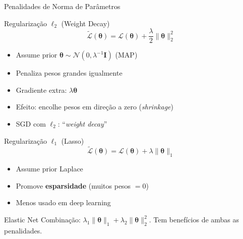 \documentclass[7pt, aspectratio=169,10pt]{beamer}
\newcommand{\btheta}{\bm{\theta}}
\begin{document}
\begin{frame}{Penalidades de Norma de Parâmetros}
\begin{block}{Regularização $\ell_2$ (Weight Decay)}
\[
\tilde{\mathcal{L}}(\btheta) = \mathcal{L}(\btheta) + \frac{\lambda}{2}\|\btheta\|_2^2
\]
\small
\begin{itemize}
  \item Assume prior $\btheta \sim \mathcal{N}(0, \lambda^{-1}\mathbf{I})$ (MAP)
  \item Penaliza pesos grandes igualmente
  \item Gradiente extra: $\lambda\btheta$
  \item Efeito: encolhe pesos em direção a zero (\textit{shrinkage})
  \item SGD com $\ell_2$: ``\textit{weight decay}''
\end{itemize}
\end{block}
\end{frame}

\begin{frame}
  \begin{block}{Regularização $\ell_1$ (Lasso)}
\[
\tilde{\mathcal{L}}(\btheta) = \mathcal{L}(\btheta) + \lambda\|\btheta\|_1
\]
\small
\begin{itemize}
  \item Assume prior Laplace
  \item Promove \textbf{esparsidade} (muitos pesos $=0$)
  \item Menos usado em deep learning
\end{itemize}
\end{block}
\begin{alertblock}{Elastic Net}
\small
Combinação: $\lambda_1\|\btheta\|_1 + \lambda_2\|\btheta\|_2^2$. Tem benefícios de ambas as penalidades.
\end{alertblock}

\end{frame}
\end{document}
